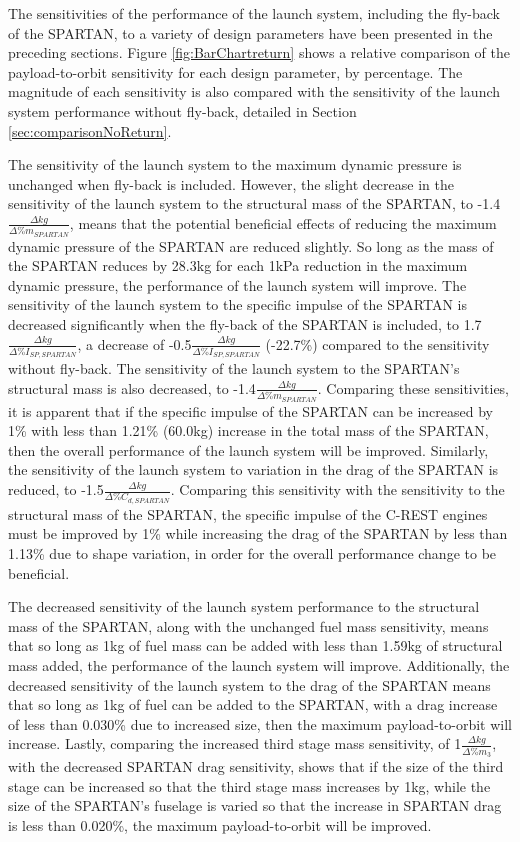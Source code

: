 The sensitivities of the performance of the launch system, including the fly-back of the SPARTAN, to a variety of design parameters have been presented in the preceding sections. Figure \ref{fig:BarChartreturn} shows a relative comparison of the payload-to-orbit sensitivity for each design parameter, by percentage. The magnitude of each sensitivity is also compared with the sensitivity of the launch system performance without fly-back, detailed in Section \ref{sec:comparisonNoReturn}.

The sensitivity of the launch system to the maximum dynamic pressure is unchanged when fly-back is included. However, the slight decrease in the sensitivity of the launch system to the structural mass of the SPARTAN, to -1.4$\frac{\Delta kg}{\Delta\%m_{SPARTAN}}$, means that the potential beneficial effects of reducing the maximum dynamic pressure of the SPARTAN are reduced slightly. So long as the mass of the SPARTAN reduces by 28.3kg for each 1kPa reduction in the maximum dynamic pressure, the performance of the launch system will improve.
 The sensitivity of the launch system to the specific impulse of the SPARTAN is decreased significantly when the fly-back of the SPARTAN is included, to 1.7$\frac{\Delta kg}{\Delta\%I_{SP,SPARTAN}}$, a decrease of -0.5$\frac{\Delta kg}{\Delta\%I_{SP,SPARTAN}}$ (-22.7\%) compared to the sensitivity without fly-back. The sensitivity of the launch system to the SPARTAN's structural mass is also decreased, to -1.4$\frac{\Delta kg}{\Delta\%m_{SPARTAN}}$. Comparing these sensitivities, it is apparent that if the specific impulse of the SPARTAN can be increased by 1\% with less than 1.21\% (60.0kg) increase in the total mass of the SPARTAN, then the overall performance of the launch system will be improved.  
Similarly, the sensitivity of the launch system to variation in the drag of the SPARTAN is reduced, to -1.5$\frac{\Delta kg}{\Delta\%C_{d,SPARTAN}}$. Comparing this sensitivity with the sensitivity to the structural mass of the SPARTAN, the specific impulse of the C-REST engines must be improved by 1\% while increasing the drag of the SPARTAN by less than 1.13\% due to shape variation, in order for the overall performance change to be beneficial. 

The decreased sensitivity of the launch system performance to the structural mass of the SPARTAN, along with the unchanged fuel mass sensitivity, means that so long as 1kg of fuel mass can be added with less than 1.59kg of structural mass added, the performance of the launch system will improve. Additionally, the decreased sensitivity of the launch system to the drag of the SPARTAN means that so long as 1kg of fuel can be added to the SPARTAN, with a drag increase of less than 0.030\% due to increased size, then the maximum payload-to-orbit will increase. 
Lastly, comparing the increased third stage mass sensitivity, of 1$\frac{\Delta kg}{\Delta\%m_{3}}$, with the decreased SPARTAN drag sensitivity, shows that if the size of the third stage can be increased so that the third stage mass increases by 1kg, while the size of the SPARTAN's fuselage is varied so that the increase in SPARTAN drag is less than 0.020\%, the maximum payload-to-orbit will be improved. 





